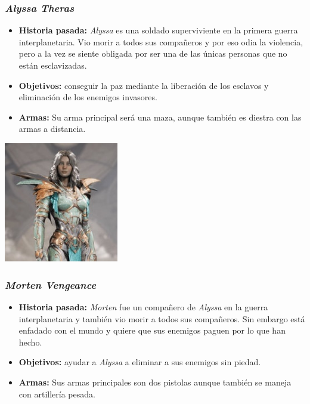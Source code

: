 \documentclass[11pt, twoside]{article}
\begin{document}
\subsubsection{\textit{Alyssa Theras}}
\begin{itemize}
\item \textbf{Historia pasada:} \textit{Alyssa} es una soldado superviviente en la primera guerra interplanetaria. Vio morir a todos sus compañeros y por eso odia la violencia, pero a la vez se siente obligada por ser una de las únicas personas que no están esclavizadas. 
\item \textbf{Objetivos:} conseguir la paz mediante la liberación de los esclavos y eliminación de los enemigos invasores.
\item \textbf{Armas:} Su arma principal será una maza, aunque también es diestra con las armas a distancia. 
\end{itemize}

\begin{center}
\includegraphics[width=5cm]{./images/alyssa.jpg}
\end{center}

\subsubsection{\textit{Morten Vengeance}}
\begin{itemize}
\item \textbf{Historia pasada:} \textit{Morten} fue un compañero de \textit{Alyssa} en la guerra interplanetaria y también vio morir a todos sus compañeros. Sin embargo está enfadado con el mundo y quiere que sus enemigos paguen por lo que han hecho. 
\item \textbf{Objetivos:} ayudar a \textit{Alyssa} a eliminar a sus enemigos sin piedad. 
\item \textbf{Armas:} Sus armas principales son dos pistolas aunque también se maneja con artillería pesada. 
\end{itemize}
\end{document}
